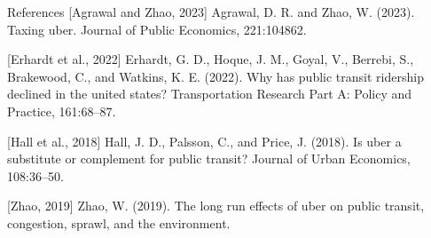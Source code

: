 \documentclass[
  ignorenonframetext,
]{beamer}
\begin{document}
\begin{frame}{References}
\protect\hypertarget{references}{}
{[}Agrawal and Zhao, 2023{]} Agrawal, D. R. and Zhao, W. (2023). Taxing
uber. Journal of Public Economics, 221:104862.

{[}Erhardt et al., 2022{]} Erhardt, G. D., Hoque, J. M., Goyal, V.,
Berrebi, S., Brakewood, C., and Watkins, K. E. (2022). Why has public
transit ridership declined in the united states? Transportation Research
Part A: Policy and Practice, 161:68--87.

{[}Hall et al., 2018{]} Hall, J. D., Palsson, C., and Price, J. (2018).
Is uber a substitute or complement for public transit? Journal of Urban
Economics, 108:36--50.

{[}Zhao, 2019{]} Zhao, W. (2019). The long run effects of uber on public
transit, congestion, sprawl, and the environment.
\end{frame}
\end{document}
